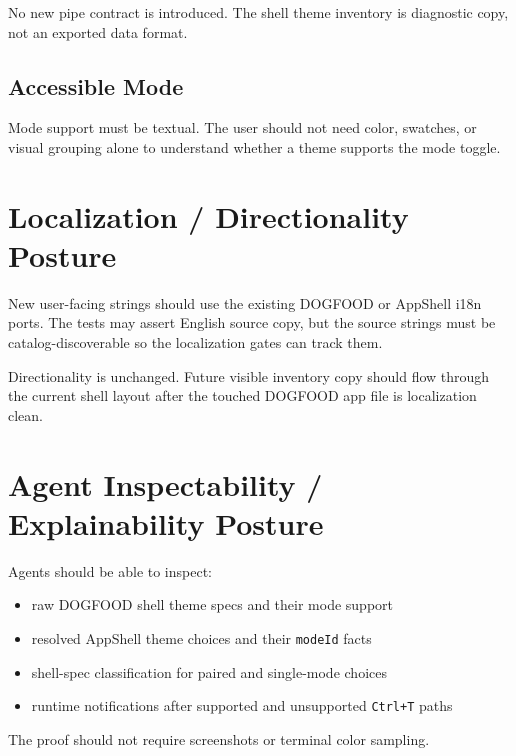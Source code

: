 No new pipe contract is introduced. The shell theme inventory is diagnostic copy, not an exported data format.

\subsection{Accessible Mode}\label{record-183-accessible-mode}

Mode support must be textual. The user should not need color, swatches, or visual grouping alone to understand whether a theme supports the mode toggle.

\section{Localization / Directionality Posture}\label{record-183-localization-directionality-posture}

New user-facing strings should use the existing DOGFOOD or AppShell i18n ports. The tests may assert English source copy, but the source strings must be catalog-discoverable so the localization gates can track them.

Directionality is unchanged. Future visible inventory copy should flow through the current shell layout after the touched DOGFOOD app file is localization clean.

\section{Agent Inspectability / Explainability Posture}\label{record-183-agent-inspectability-explainability-posture}

Agents should be able to inspect:

\begin{itemize}
\tightlist
\item
  raw DOGFOOD shell theme specs and their mode support
\item
  resolved AppShell theme choices and their \texttt{m\allowbreak{}o\allowbreak{}d\allowbreak{}e\allowbreak{}I\allowbreak{}d} facts
\item
  shell-spec classification for paired and single-mode choices
\item
  runtime notifications after supported and unsupported \texttt{C\allowbreak{}t\allowbreak{}r\allowbreak{}l\allowbreak{}+\allowbreak{}T} paths
\end{itemize}

The proof should not require screenshots or terminal color sampling.

